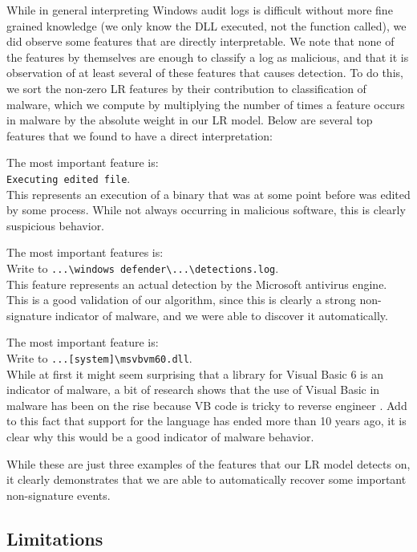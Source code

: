 \documentclass{sig-alternate-2013}
\begin{document}
While in general interpreting Windows audit logs is difficult without more fine grained knowledge (we only know the DLL executed, not the function called), we did observe some features that are directly interpretable. We note that none of the features by themselves are enough to classify a log as malicious, and that it is observation of at least several of these features that causes detection. To do this, we sort the non-zero LR features by their contribution to classification of malware, which we compute by multiplying the number of times a feature occurs in malware by the absolute weight in our LR model. Below are several top features that we found to have a direct interpretation:



The  most important feature is:\\
\verb+Executing edited file+.\\
This represents an execution of a binary that was at some point before was edited by some process. While not always occurring in malicious software, this is clearly suspicious behavior.

The  most important features is:\\
Write to \verb+...\windows defender\...\detections.log+.\\
This feature represents an actual detection by the Microsoft antivirus engine. This is a good validation of our algorithm, since this is clearly a strong non-signature indicator of malware, and we were able to discover it automatically.

The  most important feature is:\\
Write to \verb+...[system]\msvbvm60.dll+.\\
While at first it might seem surprising that a library for Visual Basic 6 is an indicator of malware, a bit of research shows that the use of Visual Basic in malware has been on the rise because VB code is tricky to reverse engineer \cite{lavasoft2015}. Add to this fact that support for the language has ended more than 10 years ago, it is clear why this would be a good indicator of malware behavior.

While these are just three examples of the features that our LR model detects on, it clearly demonstrates that we are able to automatically recover some important non-signature events.

\subsection{Limitations}
\end{document}
